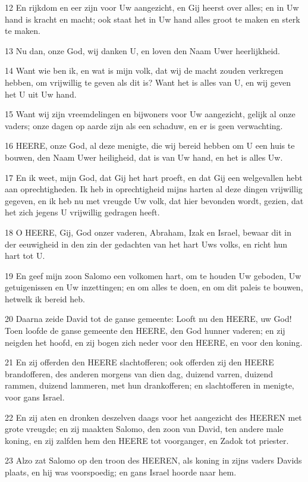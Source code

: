 \par 12 En rijkdom en eer zijn voor Uw aangezicht, en Gij heerst over alles; en in Uw hand is kracht en macht; ook staat het in Uw hand alles groot te maken en sterk te maken.
\par 13 Nu dan, onze God, wij danken U, en loven den Naam Uwer heerlijkheid.
\par 14 Want wie ben ik, en wat is mijn volk, dat wij de macht zouden verkregen hebben, om vrijwillig te geven als dit is? Want het is alles van U, en wij geven het U uit Uw hand.
\par 15 Want wij zijn vreemdelingen en bijwoners voor Uw aangezicht, gelijk al onze vaders; onze dagen op aarde zijn als een schaduw, en er is geen verwachting.
\par 16 HEERE, onze God, al deze menigte, die wij bereid hebben om U een huis te bouwen, den Naam Uwer heiligheid, dat is van Uw hand, en het is alles Uw.
\par 17 En ik weet, mijn God, dat Gij het hart proeft, en dat Gij een welgevallen hebt aan oprechtigheden. Ik heb in oprechtigheid mijns harten al deze dingen vrijwillig gegeven, en ik heb nu met vreugde Uw volk, dat hier bevonden wordt, gezien, dat het zich jegens U vrijwillig gedragen heeft.
\par 18 O HEERE, Gij, God onzer vaderen, Abraham, Izak en Israel, bewaar dit in der eeuwigheid in den zin der gedachten van het hart Uws volks, en richt hun hart tot U.
\par 19 En geef mijn zoon Salomo een volkomen hart, om te houden Uw geboden, Uw getuigenissen en Uw inzettingen; en om alles te doen, en om dit paleis te bouwen, hetwelk ik bereid heb.
\par 20 Daarna zeide David tot de ganse gemeente: Looft nu den HEERE, uw God! Toen loofde de ganse gemeente den HEERE, den God hunner vaderen; en zij neigden het hoofd, en zij bogen zich neder voor den HEERE, en voor den koning.
\par 21 En zij offerden den HEERE slachtofferen; ook offerden zij den HEERE brandofferen, des anderen morgens van dien dag, duizend varren, duizend rammen, duizend lammeren, met hun drankofferen; en slachtofferen in menigte, voor gans Israel.
\par 22 En zij aten en dronken deszelven daags voor het aangezicht des HEEREN met grote vreugde; en zij maakten Salomo, den zoon van David, ten andere male koning, en zij zalfden hem den HEERE tot voorganger, en Zadok tot priester.
\par 23 Alzo zat Salomo op den troon des HEEREN, als koning in zijns vaders Davids plaats, en hij was voorspoedig; en gans Israel hoorde naar hem.
